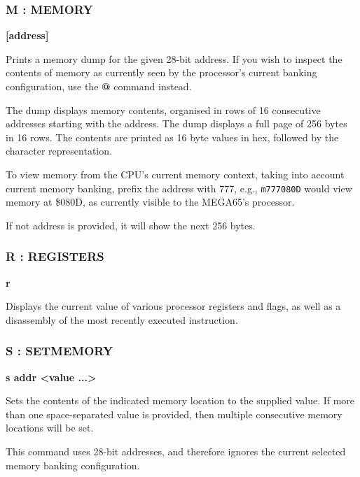 \subsubsection{M : MEMORY}
\begin{description}[leftmargin=2cm,style=nextline]
\item [Format:] {\bf <m|M> [address]}
\item [Usage:] Prints a memory dump for the given 28-bit address.
  If you wish to inspect the contents of memory as currently seen
  by the processor's current banking configuration, use the {\bf @}
  command instead.

  The dump displays memory contents, organised in rows
  of 16 consecutive addresses starting with the
  address. The dump displays
  a full page of 256 bytes in 16 rows.
  The contents are printed as 16 byte values in hex,
  followed by the character representation.

  To view memory from the CPU's current memory context, taking into account
  current memory banking, prefix the address with 777, e.g., {\tt m777080D}
  would view memory at \$080D, as currently visible to the MEGA65's processor.


\item [Remarks:] If not address is provided, it will show the next 256 bytes.

\end{description}

\subsubsection{R : REGISTERS}
\begin{description}[leftmargin=2cm,style=nextline]
\item [Format:] {\bf r}
\item [Usage:] Displays the current value of various processor registers
  and flags, as well as a disassembly of the most recently executed
  instruction.

\end{description}

\subsubsection{S : SETMEMORY}
\begin{description}[leftmargin=2cm,style=nextline]
\item [Format:] {\bf s addr <value ...>}
\item [Usage:] Sets the contents of the indicated memory location to the supplied value.
  If more than one space-separated value is provided, then multiple consecutive memory
  locations will be set.

  This command uses 28-bit addresses, and therefore ignores the current selected memory banking
  configuration.

\end{description}


